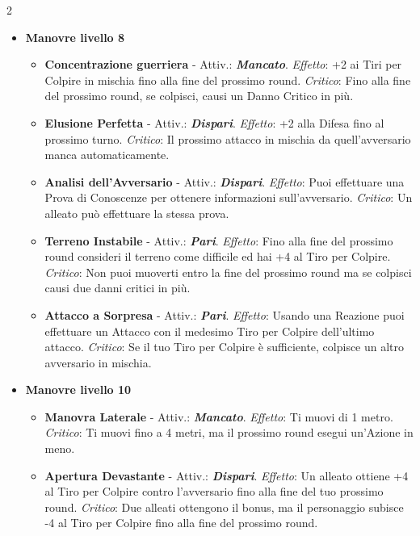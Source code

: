 \begin{multicols}{2}
\begin{itemize}[leftmargin=*]
	\item \textbf{Manovre livello 8}
	\begin{itemize}[leftmargin=*]
		\setlength{\itemsep}{0pt}
		\item \textbf{Concentrazione guerriera} - Attiv.: \textbf{\emph{Mancato}}. \emph{Effetto}: +2 ai Tiri per Colpire in mischia fino alla fine del prossimo round. \emph{Critico}: Fino alla fine del prossimo round, se colpisci, causi un Danno Critico in più.

		\item \textbf{Elusione Perfetta} - Attiv.: \textbf{\emph{Dispari}}. \emph{Effetto}: +2 alla Difesa fino al prossimo turno. \emph{Critico}: Il prossimo attacco in mischia da quell'avversario manca automaticamente.

		\item \textbf{Analisi dell'Avversario} - Attiv.: \textbf{\emph{Dispari}}. \emph{Effetto}: Puoi effettuare una Prova di Conoscenze per ottenere informazioni sull'avversario. \emph{Critico}: Un alleato può effettuare la stessa prova.

		\item \textbf{Terreno Instabile} - Attiv.: \textbf{\emph{Pari}}. \emph{Effetto}: Fino alla fine del prossimo round consideri il terreno come difficile ed hai +4 al Tiro per Colpire. \emph{Critico}: Non puoi muoverti entro la fine del prossimo round ma se colpisci causi due danni critici in più.

		\item \textbf{Attacco a Sorpresa} - Attiv.: \textbf{\emph{Pari}}. \emph{Effetto}: Usando una Reazione puoi effettuare un Attacco con il medesimo Tiro per Colpire dell'ultimo attacco. \emph{Critico}: Se il tuo Tiro per Colpire è sufficiente, colpisce un altro avversario in mischia.
	\end{itemize}

	\item \textbf{Manovre livello 10}
	\begin{itemize}[leftmargin=*]
		\setlength{\itemsep}{0pt}
		\item \textbf{Manovra Laterale} - Attiv.: \textbf{\emph{Mancato}}. \emph{Effetto}: Ti muovi di 1 metro. \emph{Critico}: Ti muovi fino a 4 metri, ma il prossimo round esegui un'Azione in meno.

		\item \textbf{Apertura Devastante} - Attiv.: \textbf{\emph{Dispari}}. \emph{Effetto}: Un alleato ottiene +4 al Tiro per Colpire contro l'avversario fino alla fine del tuo prossimo round. \emph{Critico}: Due alleati ottengono il bonus, ma il personaggio subisce -4 al Tiro per Colpire fino alla fine del prossimo round.


\end{itemize}
\end{itemize}
\end{multicols}
